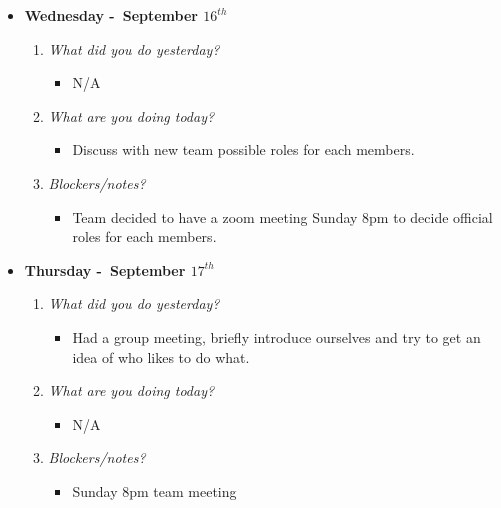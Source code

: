 \begin{itemize}
  \item[] \textbf{\large Wednesday -\ September \(16^{th}\)}
  \begin{enumerate}
    \item \textsl{What did you do yesterday?}
    \begin{itemize}
      \item N/A
    \end{itemize}
    \item \textsl{What are you doing today?}
    \begin{itemize}
      \item Discuss with new team possible roles for each members.
    \end{itemize}
    \item \textsl{Blockers/notes?}
    \begin{itemize}
      \item Team decided to have a zoom meeting Sunday 8pm to decide official roles for each members.
    \end{itemize}
  \end{enumerate}
\end{itemize}
\textbf{}
\begin{itemize}
  \item[] \textbf{\large Thursday -\ September \(17^{th}\)}
  \begin{enumerate}
    \item \textsl{What did you do yesterday?}
    \begin{itemize}
      \item Had a group meeting, briefly introduce ourselves and try to get an idea of who likes to do what.
    \end{itemize}
    \item \textsl{What are you doing today?}
    \begin{itemize}
      \item N/A
    \end{itemize}
    \item \textsl{Blockers/notes?}
    \begin{itemize}
      \item Sunday 8pm team meeting
    \end{itemize}
  \end{enumerate}
\end{itemize}
\textbf{}
